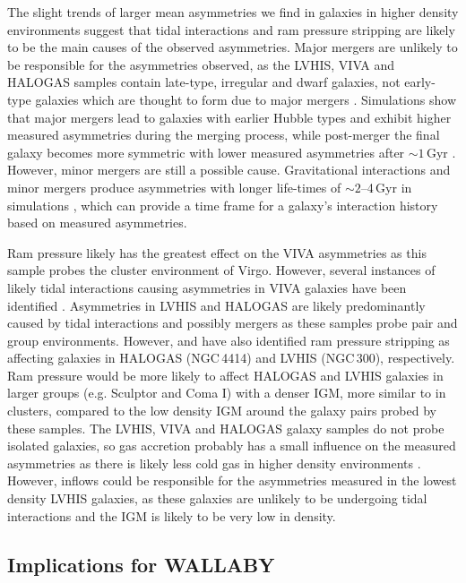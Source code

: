 \documentclass[fleqn,usenatbib]{mnras}
\begin{document}
The slight trends of larger mean asymmetries we find in galaxies in higher density environments suggest that tidal interactions and ram pressure stripping are likely to be the main causes of the observed asymmetries. Major mergers are unlikely to be responsible for the asymmetries observed, as the LVHIS, VIVA and HALOGAS samples contain late-type, irregular and dwarf galaxies, not early-type galaxies which are thought to form due to major mergers \citep[e.g.][]{Toomre1977}. Simulations show that major mergers lead to galaxies with earlier Hubble types and exhibit higher measured asymmetries during the merging process, while post-merger the final galaxy becomes more symmetric with lower measured asymmetries after $\sim1$\,Gyr \citep{Walker1996,Bournaud2005a,Bournaud2005b}. However, minor mergers are still a possible cause. Gravitational interactions and minor mergers produce asymmetries with longer life-times of $\sim2$--4\,Gyr in simulations \citep{Bournaud2005b}, which can provide a time frame for a galaxy's interaction history based on measured asymmetries. 

Ram pressure likely has the greatest effect on the VIVA asymmetries as this sample probes the cluster environment of Virgo. However, several instances of likely tidal interactions causing asymmetries in VIVA galaxies have been identified \citep{Chung2009}. Asymmetries in LVHIS and HALOGAS are likely predominantly caused by tidal interactions and possibly mergers as these samples probe pair and group environments. However, \cite{deblok2014} and \cite{Westmeier2011} have also identified ram pressure stripping as affecting galaxies in HALOGAS (NGC\,4414) and LVHIS (NGC\,300), respectively. Ram pressure would be more likely to affect HALOGAS and LVHIS galaxies in larger groups (e.g. Sculptor and Coma I) with a denser IGM, more similar to in clusters, compared to the low density IGM around the galaxy pairs probed by these samples. The LVHIS, VIVA and HALOGAS galaxy samples do not probe isolated galaxies, so gas accretion probably has a small influence on the measured asymmetries as there is likely less cold gas in higher density environments \citep[e.g.][]{Angiras2006}. However, inflows could be responsible for the asymmetries measured in the lowest density LVHIS galaxies, as these galaxies are unlikely to be undergoing tidal interactions and the IGM is likely to be very low in density. 


\subsection{Implications for WALLABY}
\label{s-sec:wallaby_implications}
\end{document}
